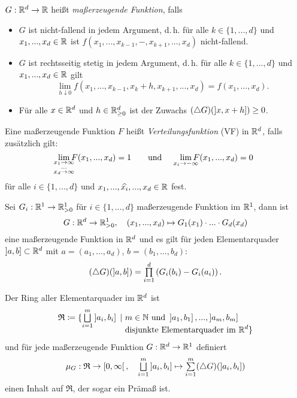 \documentclass{cheat-sheet}
\newcommand{\Ring}{\mathfrak{R}} %
\begin{document}
\begin{defn}
  $G : \mathbb{R}^d \to \mathbb{R}$ heißt \emph{maßerzeugende Funktion}, falls
  \begin{itemize}
    \item $G$ ist nicht-fallend in jedem Argument, d.\,h. für alle $k \in \{ 1, ..., d \}$ und $x_1, ..., x_d \in \mathbb{R}$ ist $f(x_1, ..., x_{k-1}, -, x_{k+1}, ..., x_d)$ nicht-fallend.
    \item $G$ ist rechtsseitig stetig in jedem Argument, d.\,h. für alle $k \in \{ 1, ..., d \}$ und $x_1, ..., x_d \in \mathbb{R}$ gilt
    \[ \lim_{h \downarrow 0} f(x_1, ..., x_{k-1}, x_k + h, x_{k+1}, ..., x_d) = f(x_1, ..., x_d). \]
    \item Für alle $x \in \mathbb{R}^d$ und $h \in \mathbb{R}_{\geq 0}^d$ ist der Zuwachs $(\triangle G)(\left] x, x + h \right]) \geq 0$.
  \end{itemize}
\end{defn}


\begin{defn}
  Eine maßerzeugende Funktion $F$ heißt \emph{Verteilungsfunktion} (VF) in $\mathbb{R}^d$, falls zusätzlich gilt:
  \[
    \lim_{\mathclap{\substack{x_1 \to \infty \\ ... \\ x_d \to \infty}}} F(x_1, ..., x_d) = 1
    \qquad \text{und} \qquad
    \lim_{\mathclap{x_i \to -\infty}} F(x_1, ..., x_d) = 0
  \]
  für alle $i \in \{ 1, ..., d \}$ und $x_1, ..., \widehat{x_i}, ..., x_d \in \mathbb{R}$ fest.
\end{defn}

\begin{bem}
  Sei $G_i : \mathbb{R}^1 \to \mathbb{R}_{> 0}^1$ für $i \in \{ 1, ..., d \}$ maßerzeugende Funktion im $\mathbb{R}^1$, dann ist
  \[ G : \mathbb{R}^d \to \mathbb{R}_{>0}^1, \quad (x_1, ..., x_d) \mapsto G_1(x_1) \cdot ... \cdot G_d(x_d) \]
  eine maßerzeugende Funktion in $\mathbb{R}^d$ und es gilt für jeden Elementarquader $\left] a, b \right] \subset \mathbb{R}^d$ mit $a = (a_1, ..., a_d)$, $b = (b_1, ..., b_d)$:
  \[ (\triangle G)(\ocinterval{a}{b}) = \prod_{i=1}^d \left( G_i(b_i) - G_i(a_i) \right). \]
\end{bem}

\begin{satz}
  Der Ring aller Elementarquader im $\mathbb{R}^d$ ist
  \begin{align*}
     \Ring \coloneqq \{ \bigsqcup_{i=1}^m \ocinterval{a_i}{b_i} \,\mid\,\, & m \in \N \text{ und } \ocinterval{a_1}{b_1}, ..., \ocinterval{a_m}{b_m} \\[-8pt]
     & \text{disjunkte Elementarquader im } \R^d \}
  \end{align*}
  und für jede maßerzeugende Funktion $G : \mathbb{R}^d \to \mathbb{R}^1$ definiert
  \[ \mu_G : \Ring \to \cointerval{0}{\infty}, \quad \bigsqcup_{i=1}^m \ocinterval{a_i}{b_i} \mapsto \sum_{i=1}^m (\triangle G)(\ocinterval{a_i}{b_i}) \]
  einen Inhalt auf $\Ring$, der sogar ein Prämaß ist.
\end{satz}
\end{document}
